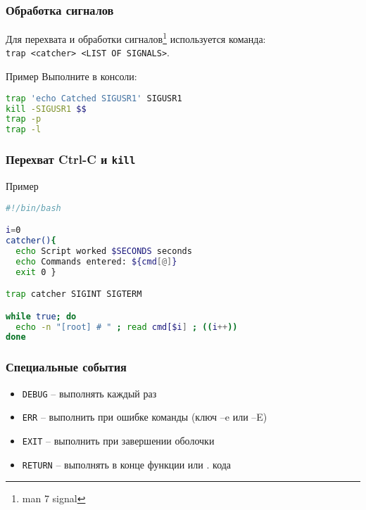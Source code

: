 \begin{frame}[fragile]
	\frametitle{Обработка сигналов}
	
	Для перехвата и обработки сигналов\footnote{man 7 signal} используется команда:\\
	{\tt trap <catcher> <LIST OF SIGNALS>}.

	\begin{block}{Пример}
		Выполните в консоли:
			\begin{lstlisting}[language=sh]
trap 'echo Catched SIGUSR1' SIGUSR1
kill -SIGUSR1 $$
trap -p
trap -l
			\end{lstlisting}
	\end{block}
\end{frame}


\begin{frame}[fragile]
	\frametitle{Перехват Ctrl-C и {\tt kill}}
	
	\begin{block}{Пример}
		\begin{lstlisting}[language=sh]
#!/bin/bash

i=0
catcher(){
  echo Script worked $SECONDS seconds
  echo Commands entered: ${cmd[@]}
  exit 0 }

trap catcher SIGINT SIGTERM

while true; do
  echo -n "[root] # " ; read cmd[$i] ; ((i++))
done
		\end{lstlisting}
	\end{block}
\end{frame}


\begin{frame}[fragile]
	\frametitle{Специальные события}

	\begin{itemize}
		\item {\tt DEBUG} -- выполнять каждый раз 
		\item {\tt ERR} -- выполнить при ошибке команды (ключ --e или --E)
		\item {\tt EXIT} -- выполнить при завершении оболочки 
		\item {\tt RETURN} -- выполнять в конце функции или . кода
	\end{itemize}
\end{frame}
